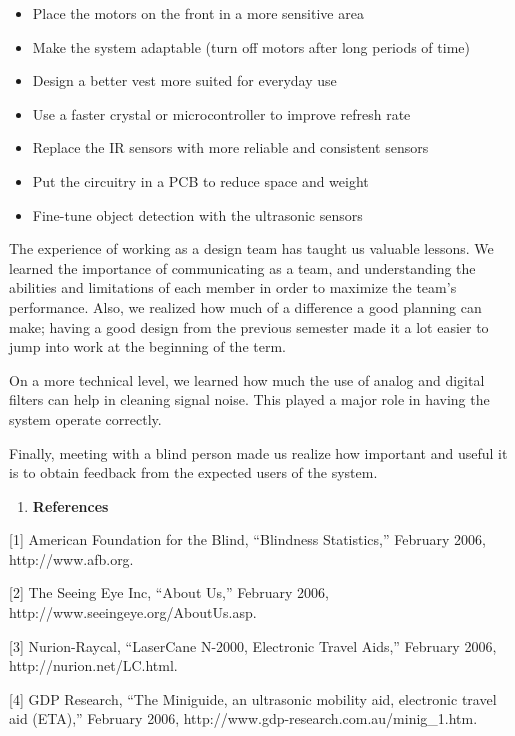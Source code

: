 \begin{itemize}
\item
  Place the motors on the front in a more sensitive area
\item
  Make the system adaptable (turn off motors after long periods of time)
\item
  Design a better vest more suited for everyday use
\item
  Use a faster crystal or microcontroller to improve refresh rate
\item
  Replace the IR sensors with more reliable and consistent sensors
\item
  Put the circuitry in a PCB to reduce space and weight
\item
  Fine-tune object detection with the ultrasonic sensors
\end{itemize}

The experience of working as a design team has taught us valuable
lessons. We learned the importance of communicating as a team, and
understanding the abilities and limitations of each member in order to
maximize the team's performance. Also, we realized how much of a
difference a good planning can make; having a good design from the
previous semester made it a lot easier to jump into work at the
beginning of the term.

On a more technical level, we learned how much the use of analog and
digital filters can help in cleaning signal noise. This played a major
role in having the system operate correctly.

Finally, meeting with a blind person made us realize how important and
useful it is to obtain feedback from the expected users of the system.

\begin{enumerate}
\def\labelenumi{\arabic{enumi}.}
\setcounter{enumi}{4}
\item
  \textbf{References}
\end{enumerate}

{[}1{]} American Foundation for the Blind, ``Blindness Statistics,''
February 2006, http://www.afb.org.

{[}2{]} The Seeing Eye Inc, ``About Us,'' February 2006,
http://www.seeingeye.org/AboutUs.asp.

{[}3{]} Nurion-Raycal, ``LaserCane N-2000, Electronic Travel Aids,''
February 2006, http://nurion.net/LC.html.

{[}4{]} GDP Research, ``The Miniguide, an ultrasonic mobility aid,
electronic travel aid (ETA),'' February 2006,
http://www.gdp-research.com.au/minig\_1.htm.

